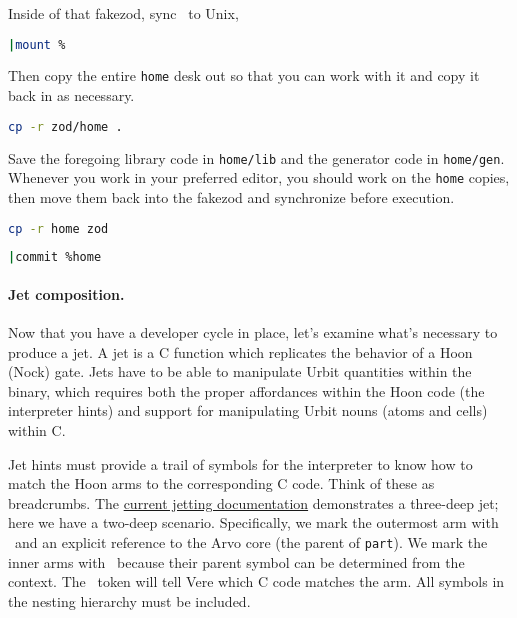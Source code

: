 \begin{example}
Inside of that fakezod, sync \clay~to Unix,

\begin{lstlisting}[caption={Terminal 2 (Urbit)},
                   language=bash,
                   style=nonumbers]
|mount %
\end{lstlisting}

Then copy the entire \texttt{home} desk out so that you can work with it and copy it back in as necessary.

\begin{lstlisting}[caption={Terminal 1 (Bash)},
                   language=bash,
                   style=nonumbers]
cp -r zod/home .
\end{lstlisting}

Save the foregoing library code in \texttt{home/lib} and the generator code in \texttt{home/gen}.  Whenever you work in your preferred editor, you should work on the \texttt{home} copies, then move them back into the fakezod and synchronize before execution.

\begin{lstlisting}[caption={Terminal 1 (Bash)},
                   language=bash,
                   style=nonumbers]
cp -r home zod
\end{lstlisting}

\begin{lstlisting}[caption={Terminal 2 (Urbit)},
                   language=bash,
                   style=nonumbers]
|commit %home
\end{lstlisting}

\paragraph{Jet composition.}

Now that you have a developer cycle in place, let's examine what's necessary to produce a jet.  A jet is a C function which replicates the behavior of a Hoon (Nock) gate.  Jets have to be able to manipulate Urbit quantities within the binary, which requires both the proper affordances within the Hoon code (the interpreter hints) and support for manipulating Urbit nouns (atoms and cells) within C.

Jet hints must provide a trail of symbols for the interpreter to know how to match the Hoon arms to the corresponding C code.  Think of these as breadcrumbs.  The \href{https://urbit.org/docs/vere/jetting/}{current jetting documentation} demonstrates a three-deep jet; here we have a two-deep scenario.  Specifically, we mark the outermost arm with \sigcen~and an explicit reference to the Arvo core (the parent of \texttt{part}).  We mark the inner arms with \sigfas~because their parent symbol can be determined from the context.  The \pattas~token will tell Vere which C code matches the arm.  All symbols in the nesting hierarchy must be included.


\end{example}
